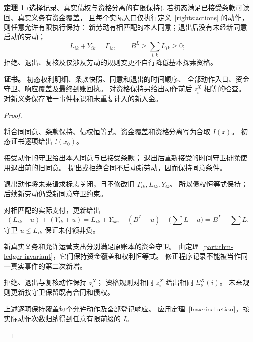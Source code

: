 \documentclass[UTF8,12pt,a4paper,openany,fontset=none,zihao=false]{ctexrep}
\theoremstyle{definition}
\newtheorem{theorem}{定理}[chapter]
\newenvironment{certificate}{\par\noindent\textbf{证书。}\ignorespaces}{\par}
\newcommand{\1}{\mathbf 1}
\begin{document}
\begin{theorem}[选择记录、真实债权与资格分离的有限保持]
\label{rights:invariant}
若初态满足已接受条款可读回、真实义务有资金覆盖，
且每个实际入口仅执行定义~\ref{rights:actions} 的动作，
则任意允许有限执行保持：
新劳动有相匹配的本人同意；退出后没有未经新同意启动的劳动；
\[
L_{ik}+Y_{ik}=\Gamma_{ik},\qquad
B^L\ge\sum_{i,k}L_{ik}\ge0;
\]
拒绝、退出、复核及仅涉及劳动的规则变更不自行降低基本探索资格。
\end{theorem}
\begin{certificate}
初态权利明细、条款快照、同意和退出的时间顺序、
全部动作入口、资金守卫、响应覆盖及最终到账回执。
对资格保持另给出动作前后 \(z_i^X\) 相等的检查。
对新义务保存唯一事件标识和未重复计入的新入金。
\end{certificate}
\begin{proof}
\begin{semanticsteps}
\item 将合同同意、条款保持、债权恒等式、资金覆盖和资格分离写为合取 \(I(x)\)。
初态证书逐项给出 \(I(x_0)\)。
\item 接受动作的守卫给出本人同意与已接受条款；
退出后重新接受的时间守卫排除使用退出前的旧同意。
提出或拒绝合同不启动新劳动，因而保持同意条件。
\item 退出动作将未来请求标志关闭，且不修改旧 \(\Gamma_{ik},L_{ik},Y_{ik}\)。
所以债权恒等式保持；后续新劳动仍受新同意守卫约束。
\item 对相匹配的实际支付，更新给出
\[
(L_{ik}-u)+(Y_{ik}+u)=L_{ik}+Y_{ik},
\quad
(B^L-u)-\bigl(\textstyle\sum L-u\bigr)=B^L-\sum L.
\]
守卫 \(u\le L_{ik}\) 保证未付额非负。
\item 新真实义务和允许运营支出分别满足原账本的资金守卫。
由定理~\ref{part:thm-ledger-invariant}，它们保持资金覆盖和权利恒等式。
修正程序记录不能被当作同一真实事件的第二次新增。
\item 拒绝、退出与复核动作保持 \(z_i^X\)；
资格规则对相同 \(z_i^X\) 给出相同 \(E^X_\nu(i)\)。
未来规则更新按守卫保留既有合同和债权。
\item 上述逐项保持覆盖每个允许动作及全部登记响应。
应用定理~\ref{base:induction}，按实际动作次数归纳得到任意有限前缀的 \(I\)。
\end{semanticsteps}
\end{proof}
\end{document}
